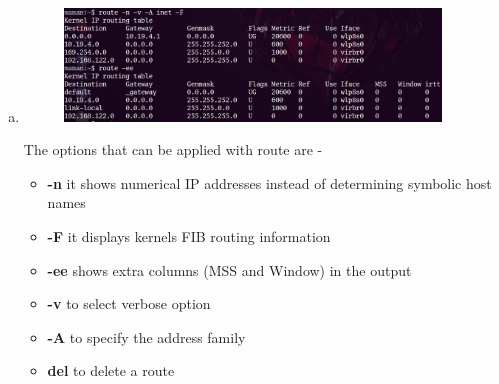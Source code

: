 \documentclass[a4paper,10pt]{article}
\newlength{\strutheight}
\begin{document}
\begin{enumerate}[a)]
	\item 
	\begin{adjustbox}{valign=T,raise=\strutheight,minipage={\linewidth}}
		\begin{figure}
			\includegraphics[width=10cm]{route2.png}
		\end{figure}
		\strut{}
		The options that can be applied with route are -
		\begin{itemize}
			\item \textbf{-n} it shows numerical IP addresses instead of determining symbolic host names
			\vspace{-0.2cm}\item \textbf{-F} it displays kernels FIB routing information
			\vspace{-0.5cm}\item \textbf{-ee} shows extra columns (MSS and Window) in the output
			\vspace{-0.2cm}\item \textbf{-v} to select verbose option
			\vspace{-0.2cm}\item \textbf{-A} to specify the address family
			\vspace{-0.2cm}\item \textbf{del} to delete a route
		\end{itemize}
	\end{adjustbox} 
	
\end{enumerate}
\end{document}
